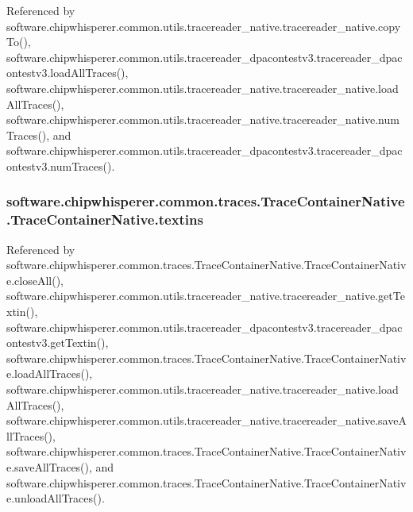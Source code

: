 Referenced by software.\+chipwhisperer.\+common.\+utils.\+tracereader\+\_\+native.\+tracereader\+\_\+native.\+copy\+To(), software.\+chipwhisperer.\+common.\+utils.\+tracereader\+\_\+dpacontestv3.\+tracereader\+\_\+dpacontestv3.\+load\+All\+Traces(), software.\+chipwhisperer.\+common.\+utils.\+tracereader\+\_\+native.\+tracereader\+\_\+native.\+load\+All\+Traces(), software.\+chipwhisperer.\+common.\+utils.\+tracereader\+\_\+native.\+tracereader\+\_\+native.\+num\+Traces(), and software.\+chipwhisperer.\+common.\+utils.\+tracereader\+\_\+dpacontestv3.\+tracereader\+\_\+dpacontestv3.\+num\+Traces().

\hypertarget{classsoftware_1_1chipwhisperer_1_1common_1_1traces_1_1TraceContainerNative_1_1TraceContainerNative_a30a61137c4a283728790eb81a96f5868}{}
\subsubsection[{textins}]{\setlength{\rightskip}{0pt plus 5cm}software.\+chipwhisperer.\+common.\+traces.\+Trace\+Container\+Native.\+Trace\+Container\+Native.\+textins}\label{classsoftware_1_1chipwhisperer_1_1common_1_1traces_1_1TraceContainerNative_1_1TraceContainerNative_a30a61137c4a283728790eb81a96f5868}


Referenced by software.\+chipwhisperer.\+common.\+traces.\+Trace\+Container\+Native.\+Trace\+Container\+Native.\+close\+All(), software.\+chipwhisperer.\+common.\+utils.\+tracereader\+\_\+native.\+tracereader\+\_\+native.\+get\+Textin(), software.\+chipwhisperer.\+common.\+utils.\+tracereader\+\_\+dpacontestv3.\+tracereader\+\_\+dpacontestv3.\+get\+Textin(), software.\+chipwhisperer.\+common.\+traces.\+Trace\+Container\+Native.\+Trace\+Container\+Native.\+load\+All\+Traces(), software.\+chipwhisperer.\+common.\+utils.\+tracereader\+\_\+native.\+tracereader\+\_\+native.\+load\+All\+Traces(), software.\+chipwhisperer.\+common.\+utils.\+tracereader\+\_\+native.\+tracereader\+\_\+native.\+save\+All\+Traces(), software.\+chipwhisperer.\+common.\+traces.\+Trace\+Container\+Native.\+Trace\+Container\+Native.\+save\+All\+Traces(), and software.\+chipwhisperer.\+common.\+traces.\+Trace\+Container\+Native.\+Trace\+Container\+Native.\+unload\+All\+Traces().

